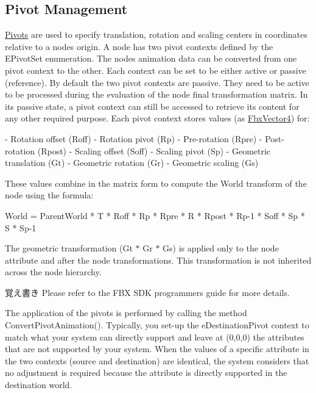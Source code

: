 \subsection*{Pivot Management}
\label{_amgrp952cff0f294966fdcb9a32a14724d5aa}%
\hyperlink{class_fbx_node_1_1_pivots}{Pivots} are used to specify translation, rotation and scaling centers in coordinates relative to a node\textquotesingle{}s origin. A node has two pivot contexts defined by the E\+Pivot\+Set enumeration. The node\textquotesingle{}s animation data can be converted from one pivot context to the other. Each context can be set to be either active or passive (reference). By default the two pivot contexts are passive. They need to be active to be processed during the evaluation of the node final transformation matrix. In its passive state, a pivot context can still be accessed to retrieve its content for any other required purpose. Each pivot context stores values (as \hyperlink{class_fbx_vector4}{Fbx\+Vector4}) for\+: 
\begin{DoxyCode}
    - Rotation offset (Roff)
    - Rotation pivot (Rp)
    - Pre-rotation (Rpre)
    - Post-rotation (Rpost)
    - Scaling offset (Soff)
    - Scaling pivot (Sp)
    - Geometric translation (Gt)
    - Geometric rotation (Gr)
    - Geometric scaling (Gs)

These values combine in the matrix form to compute the World transform of the node 
\textcolor{keyword}{using} the formula:

    World = ParentWorld * T * Roff * Rp * Rpre * R * Rpost * Rp-1 * Soff * Sp * S * Sp-1
\end{DoxyCode}


The geometric transformation (Gt $\ast$ Gr $\ast$ Gs) is applied only to the node attribute and after the node transformations. This transformation is not inherited across the node hierarchy.

\begin{DoxyNote}{覚え書き}
Please refer to the F\+BX S\+DK programmers guide for more details.
\end{DoxyNote}
The application of the pivots is performed by calling the method Convert\+Pivot\+Animation(). Typically, you set-\/up the e\+Destination\+Pivot context to match what your system can directly support and leave at (0,0,0) the attributes that are not supported by your system. When the values of a specific attribute in the two contexts (source and destination) are identical, the system considers that no adjustment is required because the attribute is directly supported in the destination world.

